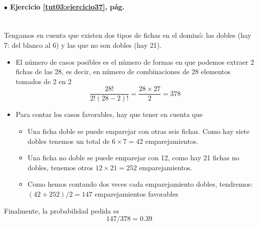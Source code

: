 \documentclass[10pt,a4paper]{article}\usepackage[]{graphicx}\usepackage[]{color}
\newcounter {cont01}
\begin{document}
\paragraph{\bf $\bullet$ Ejercicio \ref{tut03:ejercicio37}, pág. \pageref{tut03:ejercicio37}}
\label{tut03:ejercicio37:sol}\quad\\
Tengamos en cuenta que existen dos tipos de fichas en el domin\'o: las dobles (hay 7: del blanco al 6) y las que no son dobles (hay 21).
\begin{itemize}
\item El n\'umero de casos posibles es el número de formas  en que podemos extraer 2 fichas de las 28, es decir, en número de combinaciones de 28 elementos tomados de 2 en 2 
$$\frac{28!}{2!(28-2)!}=\frac{28 \times 27}{2}=378$$

\item Para contar los casos favorables, hay que tener en cuenta que
\begin{itemize}  
\item Una ficha doble se puede emparejar con otras seis fichas. Como hay siete dobles tenemos un total de $6 \times 7 =42$ 
emparejamientos.

\item Una ficha no doble se puede emparejar con 12, como hay 21 fichas no dobles, tenemos otros $12 \times 21 = 252$ emparejamientos.

\item Como hemos contando dos veces cada emparejamiento  dobles, tendremos: $(42+252)/2=147$ emparejamientos favorables
\end{itemize}
\end{itemize}
Finalmente, la probabilidad pedida es $$147/378=0\text{.}39$$


\end{document}
